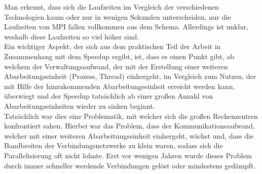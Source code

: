 				Man erkennt, dass sich die Laufzeiten im Vergleich der verschiedenen Technologien kaum oder nur in wenigen Sekunden unterscheiden, nur die Laufzeiten von MPI fallen vollkommen aus dem Schema. Allerdings ist unklar, weshalb diese Laufzeiten so viel höher sind.\\
				Ein wichtiger Aspekt, der sich aus dem praktischen Teil der Arbeit in Zusammenhang mit dem Speedup ergibt, ist, dass es einen Punkt gibt, ab welchem der Verwaltungsaufwand, der mit der Erstellung einer weiteren Abarbeitungseinheit (Prozess, Thread) einhergeht, im Vergleich zum Nutzen, der mit Hilfe der hinzukommenden Abarbeitungseinheit erreicht werden kann, überwiegt und der Speedup tatsächlich ab einer großen Anzahl von Abarbeitungseinheiten wieder zu sinken beginnt.\\
				Tatsächlich war dies eine Problematik, mit welcher sich die großen Rechenzentren konfrontiert sahen. Hierbei war das Problem, dass der Kommunikationsaufwand, welcher mit einer weiteren Abarbeitungseinheit einhergeht, wächst und, dass die Bandbreiten der Verbindungsnetzwerke zu klein waren, sodass sich die Parallelisierung oft nicht lohnte. Erst vor wenigen Jahren wurde dieses Problem durch immer schneller werdende Verbindungen gelöst oder mindestens gedämpft. \cite{ParalleleNumerischeVerfahrenSchmitt}